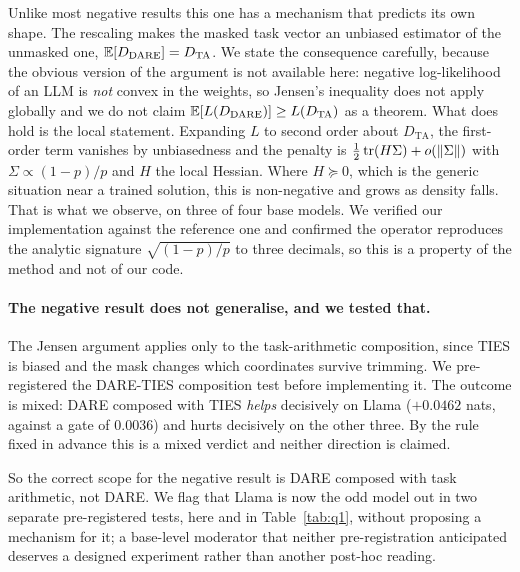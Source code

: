 Unlike most negative results this one has a mechanism that predicts its
own shape. The rescaling makes the masked task vector an unbiased
estimator of the unmasked one, $\mathbb{E}[D_{\mathrm{DARE}}] = D_{\mathrm{TA}}$.
We state the consequence carefully, because the obvious version of the
argument is not available here: negative log-likelihood of an LLM is
\emph{not} convex in the weights, so Jensen's inequality does not apply
globally and we do not claim
$\mathbb{E}[L(D_{\mathrm{DARE}})] \geq L(D_{\mathrm{TA}})$ as a theorem. What
does hold is the local statement. Expanding $L$ to second order about
$D_{\mathrm{TA}}$, the first-order term vanishes by unbiasedness and the
penalty is $\tfrac12\operatorname{tr}(H\Sigma) + o(\|\Sigma\|)$ with
$\Sigma \propto (1-p)/p$ and $H$ the local Hessian. Where $H \succeq 0$,
which is the generic situation near a trained solution, this is
non-negative and grows as density falls. That is what we observe,
on three of four base models. We verified our implementation against the
reference one and confirmed the operator reproduces the analytic signature
$\sqrt{(1-p)/p}$ to three decimals, so this is a property of the method
and not of our code.

\paragraph{The negative result does not generalise, and we tested that.}
The Jensen argument applies only to the task-arithmetic composition, since
TIES is biased and the mask changes which coordinates survive trimming. We
pre-registered the DARE-TIES composition test before implementing it. The
outcome is mixed: DARE composed with TIES \emph{helps}
decisively on Llama ($+0.0462$ nats, against a gate of $0.0036$) and hurts
decisively on the other three. By the rule fixed in advance this is a
mixed verdict and neither direction is claimed.

So the correct scope for the negative result is DARE composed with task
arithmetic, not DARE. We flag that Llama is now the odd model out in two
separate pre-registered tests, here and in Table~\ref{tab:q1}, without
proposing a mechanism for it; a base-level moderator that neither
pre-registration anticipated deserves a designed experiment rather than
another post-hoc reading.

